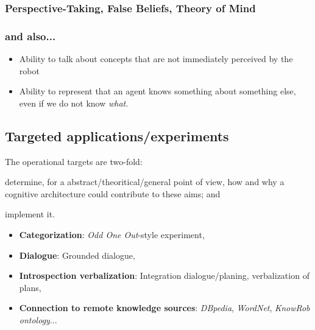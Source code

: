 \subsubsection{Perspective-Taking, False Beliefs, Theory of Mind}


\subsubsection{and also...}

\begin{itemize}
	\item Ability to talk about concepts that are not immediately perceived by
	the robot


	\item {} Ability to
	represent that an agent knows something about something else, even if we do
	not know \emph{what}.

\end{itemize}

\subsection{Targeted applications/experiments}
\label{sect|targeted-applications-experiments}


The operational targets are two-fold:

\begin{inparaenum}

	\item determine, for a abstract/theoritical/general point of view, how and
	why a cognitive architecture could contribute to these aims; and

	\item implement it.

\end{inparaenum}

\begin{itemize}
	\item \textbf{Categorization}: \emph{Odd One Out}-style experiment,
	\item \textbf{Dialogue}: Grounded dialogue,
	\item \textbf{Introspection verbalization}: Integration dialogue/planing, verbalization of plans,
	\item \textbf{Connection to remote knowledge sources}: \emph{DBpedia}, \emph{WordNet}, \emph{KnowRob ontology}...
\end{itemize}

